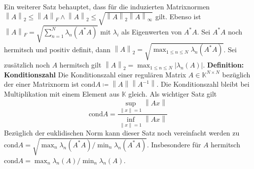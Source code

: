\documentclass{article}
\newcommand\norm[1]{\left\lVert#1\right\rVert}
\begin{document}
    Ein weiterer Satz behauptet, dass für die induzierten Matrixnormen $\norm{A}_2 \le \norm{A}_F \wedge \norm{A}_2 \le \sqrt{\norm{A}_2\norm{A}_\infty}$ gilt. Ebenso ist $\norm{A}_F= \sqrt{\sum_{n=1}^N\lambda_n(A^*A)}$ mit $\lambda_i$ als Eigenwerten von $A^*A$.\newline
    Sei $A^*A$ noch hermitsch und positiv definit, dann $\norm{A}_2 = \sqrt{\max_{1\le n\le N}\lambda_n(A^*A)}$. Sei zusätzlich noch $A$ hermitsch gilt $\norm{A}_2=\max_{1\le n\le N}|\lambda_n(A)|$.\newline
    \textbf{Definition: Konditionszahl}\newline
    Die Konditionszahl einer regulären Matrix $A\in \mathbb{K}^{N\times N}$ bezüglich der einer Matrixnorm ist $\textrm{cond} A \coloneqq  \norm{A} \norm{A^{-1}}$.\newline
    Die Konditionszahl bleibt bei Multiplikation mit einem Element aus $\mathbb{K}$ gleich.\newline
    Als wichtiger Satz gilt 
    \begin{equation}
        \textrm{cond} A =\frac{\sup_{\norm{x}=1}\norm{Ax}}{\inf_{\norm{x}=1}\norm{Ax}}
    \end{equation}
    Bezüglich der euklidischen Norm kann dieser Satz noch vereinfacht werden zu $\textrm{cond} A = \sqrt{\max_n\lambda_n(A^*A)/\min_n\lambda_n(A^*A)}$. Insbesondere für $A$ hermitsch $\textrm{cond} A = \max_n\lambda_n(A)/\min_n\lambda_n(A)$.
\end{document}
